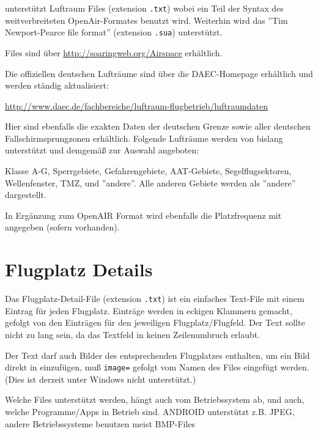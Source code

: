 \xc unterstützt Luftraum Files (extension \verb|.txt|) wobei ein Teil der Syntax
des weitverbreiteten OpenAir-Formates benutzt wird. Weiterhin wird das ''Tim Newport-Pearce file format''
(extension \verb|.sua|) unterstützt.

Files sind über  \url{http://soaringweb.org/Airspace} erhältlich.


Die offiziellen deutschen Lufträume sind über die DAEC-Homepage erhältlich und werden ständig
aktualisiert:

\url{http://www.daec.de/fachbereiche/luftraum-flugbetrieb/luftraumdaten}

Hier sind ebenfalls die exakten Daten der deutschen Grenze sowie aller deutschen Fallschirmsprungzonen
erhältlich. Folgende Lufträume werden von \xc bislang unterstützt und demgemäß zur Auswahl angeboten:

Klasse A-G, Sperrgebiete, Gefahrengebiete, AAT-Gebiete, Segelflugsektoren, Wellenfenster, TMZ, und
''andere''.  Alle anderen Gebiete werden als ''andere'' dargestellt.

In Ergänzung zum OpenAIR Format wird ebenfalls die Platzfrequenz mit angegeben (sofern vorhanden).

\section{Flugplatz Details}\label{sec:airfield-details}

Das Flugplatz-Detail-File  (extension \verb|.txt|) ist ein einfaches Text-File mit einem Eintrag für jeden
Flugplatz. Einträge werden in eckigen Klammern gemacht, gefolgt von den Einträgen für den jeweiligen
Flugplatz/Flugfeld. Der Text sollte nicht zu lang sein, da das Textfeld in  \xc keinen Zeilenumbruch
erlaubt.

Der Text darf auch Bilder des entsprechenden Flugplatzes enthalten, um ein Bild direkt in \xc einzufügen,
muß  \verb|image=| gefolgt vom Namen des Files eingefügt werden. (Dies ist derzeit unter Windows nicht
unterstützt.)


Welche Files unterstützt werden, hängt auch vom Betriebssystem ab, und auch, welche Programme/Apps
in Betrieb sind. ANDROID unterstützt z.B.  JPEG, andere Betriebssysteme benutzen meist BMP-Files

